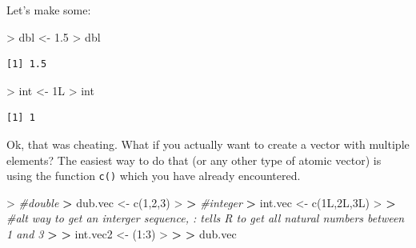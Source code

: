 \documentclass[
]{book}
\newenvironment{Shaded}{\begin{snugshade}}{\end{snugshade}}
\newcommand{\CommentTok}[1]{\textcolor[rgb]{0.56,0.35,0.01}{\textit{#1}}}
\newcommand{\DecValTok}[1]{\textcolor[rgb]{0.00,0.00,0.81}{#1}}
\newcommand{\ErrorTok}[1]{\textcolor[rgb]{0.64,0.00,0.00}{\textbf{#1}}}
\newcommand{\FloatTok}[1]{\textcolor[rgb]{0.00,0.00,0.81}{#1}}
\newcommand{\FunctionTok}[1]{\textcolor[rgb]{0.00,0.00,0.00}{#1}}
\newcommand{\NormalTok}[1]{#1}
\newcommand{\OtherTok}[1]{\textcolor[rgb]{0.56,0.35,0.01}{#1}}
\newcommand{\SpecialCharTok}[1]{\textcolor[rgb]{0.00,0.00,0.00}{#1}}
\theoremstyle{definition}
\theoremstyle{definition}
\theoremstyle{definition}
\theoremstyle{definition}
\theoremstyle{remark}
\begin{document}
Let's make some:

\begin{Shaded}
\begin{Highlighting}[]
\SpecialCharTok{\textgreater{}}\NormalTok{ dbl }\OtherTok{\textless{}{-}} \FloatTok{1.5}
\SpecialCharTok{\textgreater{}}\NormalTok{ dbl}
\end{Highlighting}
\end{Shaded}

\begin{verbatim}
[1] 1.5
\end{verbatim}

\begin{Shaded}
\begin{Highlighting}[]
\SpecialCharTok{\textgreater{}}\NormalTok{ int }\OtherTok{\textless{}{-}}\NormalTok{ 1L}
\SpecialCharTok{\textgreater{}}\NormalTok{ int}
\end{Highlighting}
\end{Shaded}

\begin{verbatim}
[1] 1
\end{verbatim}

Ok, that was cheating. What if you actually want to create a vector with multiple elements?
The easiest way to do that (or any other type of atomic vector) is using the function \texttt{c()} which you have already
encountered.

\begin{Shaded}
\begin{Highlighting}[]
\SpecialCharTok{\textgreater{}} \CommentTok{\#double}
\ErrorTok{\textgreater{}}\NormalTok{ dub.vec }\OtherTok{\textless{}{-}} \FunctionTok{c}\NormalTok{(}\DecValTok{1}\NormalTok{,}\DecValTok{2}\NormalTok{,}\DecValTok{3}\NormalTok{)}
\SpecialCharTok{\textgreater{}} 
\ErrorTok{\textgreater{}} \CommentTok{\#integer}
\ErrorTok{\textgreater{}}\NormalTok{ int.vec }\OtherTok{\textless{}{-}} \FunctionTok{c}\NormalTok{(1L,2L,3L)}
\SpecialCharTok{\textgreater{}} 
\ErrorTok{\textgreater{}} \CommentTok{\#alt way to get an interger sequence, : tells R to get all natural numbers between 1 and 3 }
\ErrorTok{\textgreater{}} 
\ErrorTok{\textgreater{}}\NormalTok{ int.vec2 }\OtherTok{\textless{}{-}}\NormalTok{ (}\DecValTok{1}\SpecialCharTok{:}\DecValTok{3}\NormalTok{)}
\SpecialCharTok{\textgreater{}} 
\ErrorTok{\textgreater{}} 
\ErrorTok{\textgreater{}}\NormalTok{ dub.vec}
\end{Highlighting}
\end{Shaded}
\end{document}
